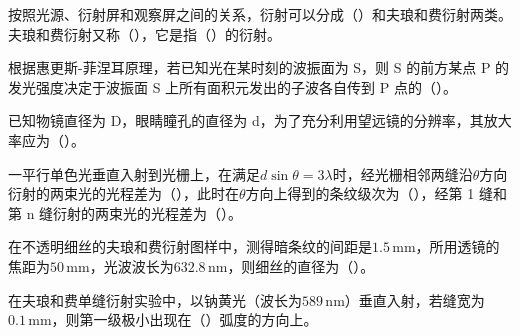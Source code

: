 \documentclass[padl, analysis, notocnum]{ExBook}
\newcommand{\answerarea}[1][3.5cm]{%
  \par\vspace{1mm}%
  \noindent{\color{themeColor!35}\rule{\linewidth}{0.4pt}}\par
  \noindent\begin{minipage}[t][#1][t]{\linewidth}\vspace{0pt}\end{minipage}\par
  \noindent{\color{themeColor!35}\rule{\linewidth}{0.4pt}}\par
}
\begin{document}
\begin{qitems}[startnum=3]
\qitem 按照光源、衍射屏和观察屏之间的关系，衍射可以分成（\hspace{1.6em}）和夫琅和费衍射两类。夫琅和费衍射又称（\hspace{1.6em}），它是指（\hspace{1.6em}）的衍射。
\label{q:277:start}
\answerarea[4.0cm]
\label{q:277:end}
\end{qitems}

\begin{qitems}[startnum=4]
\qitem 根据惠更斯-菲涅耳原理，若已知光在某时刻的波振面为 S，则 S 的前方某点 P 的发光强度决定于波振面 S 上所有面积元发出的子波各自传到 P 点的（\hspace{1.6em}）。
\label{q:278:start}
\answerarea[4.0cm]
\label{q:278:end}
\end{qitems}

\begin{qitems}[startnum=5]
\qitem 已知物镜直径为 D，眼睛瞳孔的直径为 d，为了充分利用望远镜的分辨率，其放大率应为（\hspace{1.6em}）。
\label{q:279:start}
\answerarea[4.0cm]
\label{q:279:end}
\end{qitems}

\begin{qitems}[startnum=6]
\qitem 一平行单色光垂直入射到光栅上，在满足$d\sin \theta =3\lambda$时，经光栅相邻两缝沿$\theta$方向衍射的两束光的光程差为（\hspace{1.6em}），此时在$\theta$方向上得到的条纹级次为（\hspace{1.6em}），经第 1 缝和第 n 缝衍射的两束光的光程差为（\hspace{1.6em}）。
\label{q:280:start}
\answerarea[4.0cm]
\label{q:280:end}
\end{qitems}

\begin{qitems}[startnum=7]
\qitem 在不透明细丝的夫琅和费衍射图样中，测得暗条纹的间距是$1.5\,\mathrm{mm}$，所用透镜的焦距为$50\,\mathrm{mm}$，光波波长为$632.8\,\mathrm{nm}$，则细丝的直径为（\hspace{1.6em}）。
\label{q:281:start}
\answerarea[4.0cm]
\label{q:281:end}
\end{qitems}

\begin{qitems}[startnum=8]
\qitem 在夫琅和费单缝衍射实验中，以钠黄光（波长为$589\,\mathrm{nm}$）垂直入射，若缝宽为$0.1\,\mathrm{mm}$，则第一级极小出现在（\hspace{1.6em}）弧度的方向上。
\label{q:282:start}
\answerarea[4.0cm]
\label{q:282:end}
\end{qitems}
\end{document}
